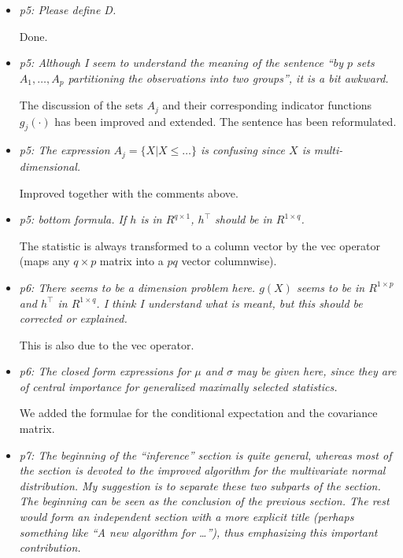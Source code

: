 \documentclass[11pt,a4paper]{article}
\begin{document}
\begin{itemize}
  
  \item \textit{p5: Please define D.}
        
	Done.
	
  \item \textit{p5: Although I seem to understand the meaning of the sentence
        ``by $p$ sets $A_1, \dots , A_p$ partitioning the observations into two
	groups'', it is a bit awkward.}
	
	The discussion of the sets $A_j$ and their corresponding indicator functions
	$g_j(\cdot)$ has been improved and extended. The sentence has been reformulated.
	
  \item \textit{p5: The expression $A_j = \{ X | X \le \dots\}$ is confusing since
        $X$ is multi-dimensional.}
	
	Improved together with the comments above.
	
  \item \textit{p5: bottom formula. If $h$ is in $R^{q \times 1}$, $h^\top$ should be
        in $R^{1 \times q}$.}
	
	The statistic is always transformed to a column vector by the vec operator
        (maps any $q \times p$ matrix into a $pq$ vector columnwise).
	
  \item \textit{p6: There seems to be a dimension problem here. $g(X)$ seems to be
        in $R^{1 \times p}$ and $h^\top$ in $R^{1 \times q}$. I think I understand
	what is meant, but this should be corrected or explained.}
	
	This is also due to the vec operator.
	
  \item \textit{p6: The closed form expressions for $\mu$ and $\sigma$ may be
        given here, since they are of central importance for generalized maximally
	selected statistics.}
	
	We added the formulae for the conditional expectation and the covariance matrix.
	
  \item \textit{p7: The beginning of the ``inference'' section is quite general,
        whereas most of the section is devoted to the improved algorithm for the
	multivariate normal distribution. My suggestion is to separate these two
	subparts of the section. The beginning can be seen as the conclusion of
	the previous section. The rest would form an independent section with a
	more explicit title (perhaps something like ``A new algorithm for \dots''),
	thus emphasizing this important contribution.}
	

\end{itemize}
\end{document}
